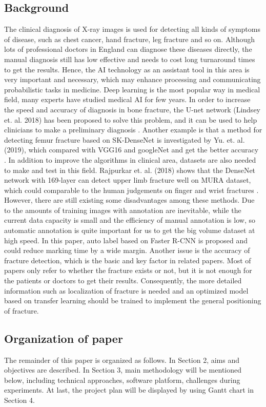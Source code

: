 \documentclass[12pt,oneside,a4paper]{article}
\begin{document}
\subsection{Background}
The clinical diagnosis of X-ray images is used for detecting all kinds of symptoms of disease, such as chest cancer, hand fracture, leg fracture and so on.  Although lots of professional doctors in England can diagnose these diseases directly, the manual diagnosis still has low effective and needs to cost long turnaround times to get the results.  Hence, the AI technology as an assistant tool in this area is very important and necessary, which may enhance processing and communicating probabilistic tasks in medicine. Deep learning is the most popular way in medical field, many experts have studied medical AI for few years. In order to increase the speed and accuracy of diagnosis in bone fracture, the U-net network (Lindsey et. al. 2018) has been proposed to solve this problem, and it can be used to help clinicians to make a preliminary diagnosis \cite{b1}. Another example is that a method for detecting femur fracture based on SK-DenseNet is investigated by Yu. et. al. (2019), which compared with VGG16 and googleNet and get the better accuracy \cite{b2}. In addition to improve the algorithms in clinical area, datasets are also needed to make and test in this field. Rajpurkar et. al. (2018) shows that the DenseNet network with 169-layer can detect upper limb fracture well on MURA dataset, which could comparable to the human judgements on finger and wrist fractures \cite{b3}. However, there are still existing some disadvantages among these methods. Due to the amounts of training images with annotation are inevitable, while the current data capacity is small and the efficiency of manual annotation is low, so automatic annotation is quite important for us to get the big volume dataset at high speed. In this paper, auto label based on Faster R-CNN \cite{b4} is proposed and could reduce marking time by a wide margin. Another issue is the accuracy of fracture detection, which is the basic and key factor in related papers. Most of papers only refer to whether the fracture exists or not, but it is not enough for the patients or doctors to get their results. Consequently, the more detailed information such as localization of fracture is needed and an optimized model based on transfer learning should be trained to implement the general positioning of fracture.

\subsection{Organization of paper}
The remainder of this paper is organized as follows. In Section 2, aims and objectives are described. In Section 3, main methodology will be mentioned below, including technical approaches, software platform, challenges during experiments. At last, the project plan will be displayed by using Gantt chart in Section 4.
\end{document}
